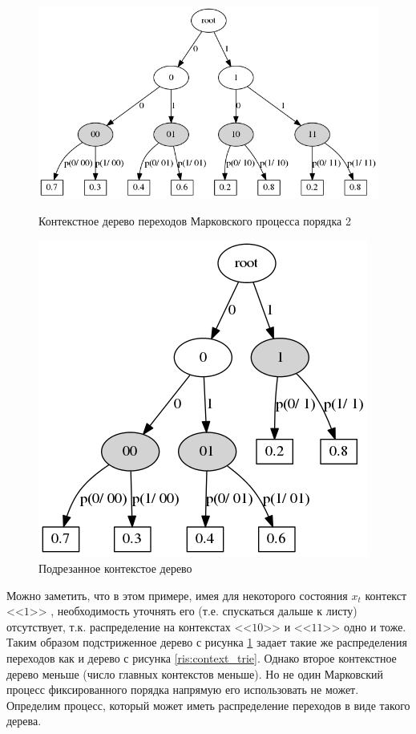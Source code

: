 \documentclass{matmex-diploma-custom}
\begin{document}
\begin{figure}[h!]\centering
\begin{minipage}[b]{0.49 \textwidth}
	\includegraphics[scale=0.3]{img/Context_trie.png}
	\centering
	\caption{ Контекстное дерево переходов Марковского процесса порядка 2 }
	\label{ris:context_trie}
	
\end{minipage}
\hfil \hfil
\begin{minipage}[b]{0.49 \textwidth}
	\includegraphics[scale=0.3]{img/Prune_c_trie.png}
	\centering
	\caption{ Подрезанное контекстое дерево }
	\label{ris:prune_c_trie}
\end{minipage}
\end{figure}
Можно заметить, что в этом примере, имея для некоторого состояния $x_{t}$ контекст  <<$1$>> , необходимость уточнять его (т.е. спускаться дальше к листу) отсутствует, т.к. распределение на контекстах  <<$10$>>  и  <<$11$>>  одно и тоже. 
Таким образом подстриженное дерево с рисунка \ref{ris:prune_c_trie} задает такие же распределения переходов как и дерево с рисунка \ref{ris:context_trie}. 
Однако второе контекстное дерево меньше (число главных контекстов меньше).
Но не один Марковский процесс фиксированного порядка напрямую его использовать не может.
Определим процесс, который может иметь распределение переходов в виде такого дерева.
\end{document}
